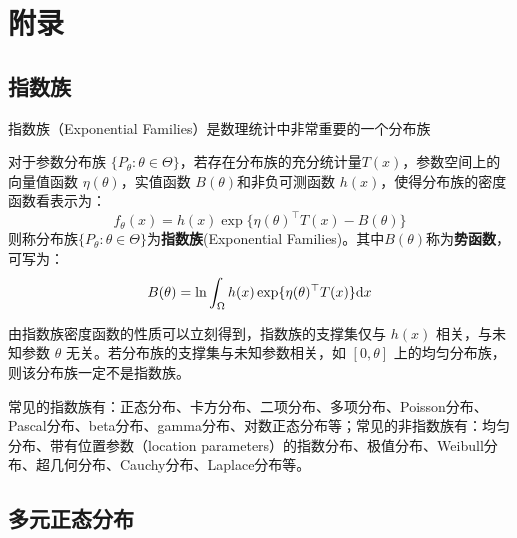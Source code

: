 \chapter{附录}

\section{指数族}

指数族（Exponential Families）是数理统计中非常重要的一个分布族

\begin{definition}[指数族]
	对于参数分布族 $\{ P_\theta: \theta \in \Theta \}$，若存在分布族的充分统计量$T(x)$，参数空间上的向量值函数 $\eta(\theta)$，实值函数 $B(\theta)$和非负可测函数 $h(x)$，使得分布族的密度函数看表示为：
	\[ f_{\theta}(x) = h(x) \exp\{\eta(\theta)^{\top}T(x)-B(\theta)\}  \]
    则称分布族$\{ P_\theta: \theta \in \Theta \}$为\textbf{指数族}(Exponential Families)。其中$B(\theta)$称为\textbf{势函数}，可写为：
    \[ B(\theta)=\ln \int_{\Omega}h(x) \exp\{\eta(\theta)^{\top}T(x)\} \mathrm{d} x  \]
\end{definition}

由指数族密度函数的性质可以立刻得到，指数族的支撑集仅与 $h(x)$ 相关，与未知参数 $\theta$ 无关。若分布族的支撑集与未知参数相关，如 $[0,\theta]$ 上的均匀分布族，则该分布族一定不是指数族。

常见的指数族有：正态分布、卡方分布、二项分布、多项分布、Poisson分布、Pascal分布、beta分布、gamma分布、对数正态分布等；常见的非指数族有：均匀分布、带有位置参数（location parameters）的指数分布、极值分布、Weibull分布、超几何分布、Cauchy分布、Laplace分布等。

\section{多元正态分布}
